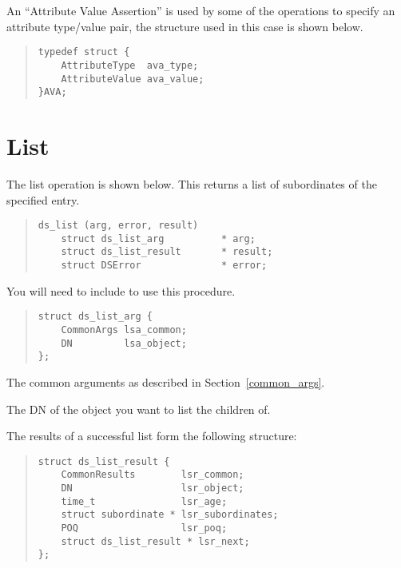 An ``Attribute Value Assertion'' is used by some of the operations to
specify an attribute type/value pair, the structure used in this case is
shown below.

\begin{quote}\small\begin{verbatim}
typedef struct {
    AttributeType  ava_type;
    AttributeValue ava_value;
}AVA;
\end{verbatim}\end{quote}

\section {List}

The list operation is shown below.
This returns a list of subordinates of the specified entry.

\begin{quote}\small\begin{verbatim}
ds_list (arg, error, result)
    struct ds_list_arg          * arg;    
    struct ds_list_result       * result;
    struct DSError              * error;
\end{verbatim}\end{quote}

You will need to include  to use this procedure.

\begin{quote}\small\begin{verbatim}
struct ds_list_arg {
    CommonArgs lsa_common;
    DN         lsa_object;
};
\end{verbatim}\end{quote}

\begin{describe}
\item [\verb"lsa\_common":] The common arguments as described in
Section~\ref{common_args}.
\item [\verb"lsa\_object":] The DN of the object you want to list the
children of.
\end{describe}

The results of a successful list form the following structure:

\begin{quote}\small\begin{verbatim}
struct ds_list_result {
    CommonResults        lsr_common;
    DN                   lsr_object;
    time_t               lsr_age;
    struct subordinate * lsr_subordinates;
    POQ                  lsr_poq;
    struct ds_list_result * lsr_next;
};
\end{verbatim}\end{quote}

